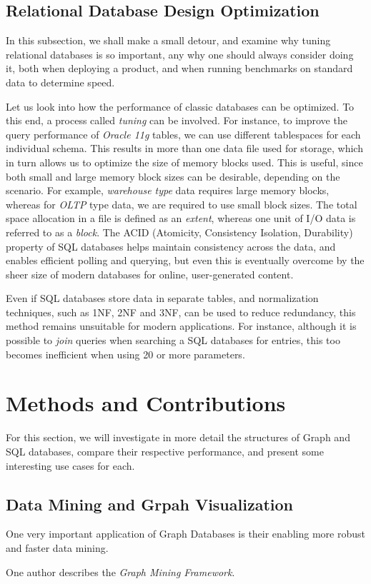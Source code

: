 \documentclass[10pt,        %
               a4paper,     %
               journal,     %
               ]{IEEEtran}
\begin{document}
\subsection{Relational Database Design Optimization}
In this subsection, we shall make a small detour, and examine why tuning relational databases is so important, any why one should always consider doing it, both when deploying a product, and when running benchmarks on standard data to determine speed. \par
Let us look into how the performance of classic databases can be optimized. To this end, a process called \textit{tuning} can be involved. For instance, to improve the query performance of \textit{Oracle 11g} tables, we can use different tablespaces for each individual schema.  This results in more than one data file used for storage, which in turn allows us to optimize the size of memory blocks used. This is useful, since both small and large memory block sizes can be desirable, depending on the scenario. For example, \textit{warehouse type} data requires large memory blocks, whereas for \textit{OLTP} type data, we are required to use small block sizes. The total space allocation in a file is defined as an \textit{extent}, whereas one unit of I/O data is referred to as a \textit{block}. 
The ACID (Atomicity, Consistency Isolation, Durability) property of SQL databases helps maintain consistency across the data, and enables efficient polling and querying, but even this is eventually overcome by the sheer size of modern databases for online, user-generated content. \par
Even if SQL databases store data in separate tables, and normalization techniques, such as 1NF, 2NF and 3NF, can be used to reduce redundancy, this method remains unsuitable for modern applications. For instance, although it is possible to \textit{join} queries when searching a SQL databases for entries, this too becomes inefficient when using 20 or more parameters. \par


\section{Methods and Contributions}
For this section, we will investigate in more detail the structures of Graph and SQL databases, compare their respective performance, and present some interesting use cases for each. \par
\subsection{Data Mining and Grpah Visualization}
One very important application of Graph Databases is their enabling more robust and faster data mining. \par
One author \cite{IEEEpaper2:swapnil} describes the \textit{Graph Mining Framework}.
\end{document}
